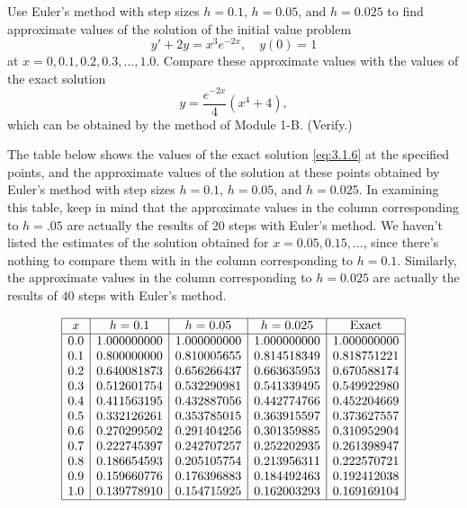 \documentclass{ximera}
\begin{document}
\begin{example}\label{example:3.1.2}
Use Euler's method with step sizes $h=0.1$, $h=0.05$, and $h=0.025$ to
find approximate values of the solution of the initial value problem
$$
y'+2y=x^3e^{-2x},\quad y(0)=1
$$
at $x=0, 0.1, 0.2, 0.3, \ldots, 1.0$. Compare these approximate
values
with the values of the exact solution
\begin{equation} \label{eq:3.1.6}
y=\frac{e^{-2x}}{4}(x^4+4),
\end{equation}
which can be obtained by the method of Module 1-B. (Verify.)
 
\begin{explanation}
The table below shows the values of the exact solution
\eqref{eq:3.1.6} at the specified points, and the approximate values of
the solution at these points obtained by Euler's method with step
sizes $h=0.1$, $h=0.05$, and $h=0.025$. In examining this table, keep
in mind that the approximate values in the column corresponding to
$h=.05$ are actually the results of 20 steps with Euler's method. We
haven't listed the estimates of the solution obtained for
$x=0.05, 0.15, \dots $, since there's nothing to compare them with in
the column corresponding to $h=0.1$. Similarly, the approximate values
in the column corresponding to $h=0.025$ are actually the results of
$40$ steps with Euler's method.
 
 
$$
\begin{array}{|c|c|c|c|c|}
\hline
x & h=0.1 & h=0.05 & h=0.025 & \text{Exact}\\ \hline
0.0 & 1.000000000 & 1.000000000 & 1.000000000 & 1.000000000 \\
0.1 & 0.800000000 & 0.810005655 & 0.814518349 & 0.818751221 \\
0.2 & 0.640081873 & 0.656266437 & 0.663635953 & 0.670588174 \\
0.3 & 0.512601754 & 0.532290981 & 0.541339495 & 0.549922980 \\
0.4 & 0.411563195 & 0.432887056 & 0.442774766 & 0.452204669 \\
0.5 & 0.332126261 & 0.353785015 & 0.363915597 & 0.373627557 \\
0.6 & 0.270299502 & 0.291404256 & 0.301359885 & 0.310952904 \\
0.7 & 0.222745397 & 0.242707257 & 0.252202935 & 0.261398947 \\
0.8 & 0.186654593 & 0.205105754 & 0.213956311 & 0.222570721 \\
0.9 & 0.159660776 & 0.176396883 & 0.184492463 & 0.192412038 \\
1.0 & 0.139778910 & 0.154715925 & 0.162003293 & 0.169169104\\
\hline
\end{array}
$$
 

\end{explanation}
\end{example}
\end{document}
